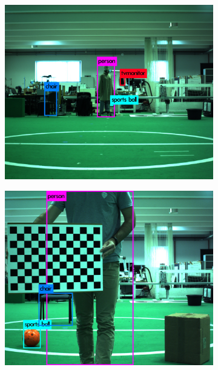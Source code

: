 \begin{figure}[!ht]
	\centering
	\begin{subfigure}[t]{0.45\textwidth}
		\includegraphics[width=\textwidth]{img/object-detection/experimental-2.jpg}
		\caption{}
		\label{fig:experimental-yolo-2}
	\end{subfigure}
	\qquad
	\begin{subfigure}[t]{0.45\textwidth}
		\includegraphics[width=\textwidth]{img/object-detection/experimental-1.jpg}
		\caption{}
		\label{fig:experimental-yolo-1}

\end{subfigure}
\end{figure}

